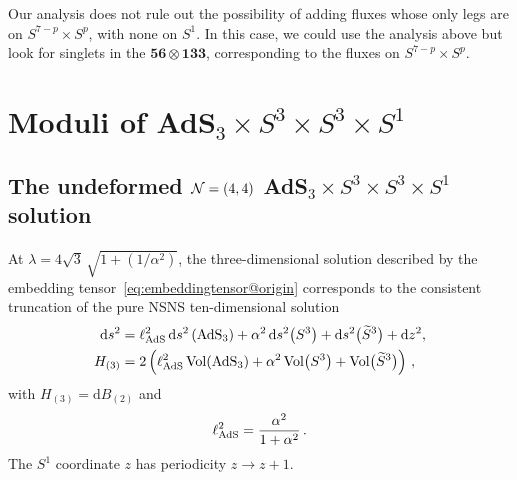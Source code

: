 \documentclass[a4paper, 11pt]{article}
\numberwithin{equation}{section}
\newcommand{\ts}[1]{\widetilde{#1}}
\newcommand{\SL}[1]{\mathrm{SL}( #1 )}
\newcommand{\En}[1]{E_{#1(#1)}}
\newcommand{\+}{\oplus}
\renewcommand{\d}{\ensuremath{\mathrm{d}}\xspace}
\newcommand{\EM}[1]{\textcolor{red}{#1}}
\begin{document}
Our analysis does not rule out the possibility of adding fluxes whose only legs are on $S^{7-p} \times S^p$, with none on $S^1$. In this case, we could use the analysis above but look for singlets in the $\mathbf{56} \otimes \mathbf{133}$, corresponding to the fluxes on $S^{7-p} \times S^p$.




\section{Moduli of \texorpdfstring{AdS$_3 \times S^3 \times S^3 \times S^1$}{AdS3xS3xS3xS1}} \label{s:Moduli}

\subsection{The undeformed ${\cal N}=(4,4)$ AdS$_3 \times S^3 \times S^3 \times S^1$ solution}
\paragraph{} At $\lambda=4\sqrt{3}\,\sqrt{1+(1/\alpha^{2})}$, the three-dimensional solution described by the embedding tensor~\eqref{eq:embeddingtensor@origin} corresponds to the consistent truncation of the pure NSNS ten-dimensional solution~\cite{deBoer:1999gea}
\begin{equation} \label{eq:AdS3}
	\begin{split}
		\d s^{2} &= \ell_{\rm AdS}^{2}\,\d s^{2}\left({\rm AdS}_{3}\right) + \alpha^{2}\,\d s^{2}\big(S^{3}\big)+\d s^{2}\big(\ts{S}^{3}\big)+\d z^{2},\\
		H_{(3)} &= 2\left(\ell_{\rm AdS}^{2}\,{\rm Vol}({\rm AdS_{3}})+\alpha^{2}\,{\rm Vol}\big(S^{3}\big)+{\rm Vol}\big(\ts{S}^{3}\big)\right)\,,
	\end{split}
\end{equation}
with $H_{(3)} = \d B_{(2)}$ and
\begin{equation}
	\ell_{\rm AdS}^{2} = \frac{\alpha^{2}}{1+\alpha^{2}}\,.
\end{equation}
The $S^{1}$ coordinate $z$ has periodicity $z\rightarrow z+1$.
\end{document}
